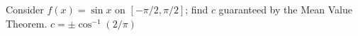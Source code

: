 {Consider $f(x) = \sin x$ on $[-\pi/2,\pi/2]$; find $c$ guaranteed by the Mean Value Theorem.
}
{$c=\pm \cos^{-1}(2/\pi)$
}

